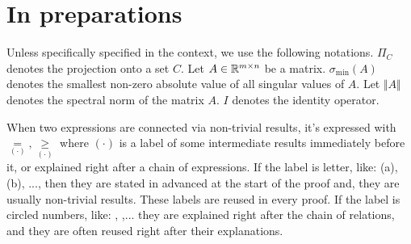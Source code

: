 \documentclass[12pt]{article}
\begin{document}
\section{In preparations}
    Unless specifically specified in the context, we use the following notations. 
    $\Pi_C$ denotes the projection onto a set $C$. 
    Let $A \in \mathbb R^{m \times n}$ be a matrix. 
    $\sigma_{\min}(A)$ denotes the smallest non-zero absolute value of all singular values of $A$. 
    Let $\Vert A\Vert$ denotes the spectral norm of the matrix $A$. 
    $I$ denotes the identity operator. 
    \par
    When two expressions are connected via non-trivial results, it's expressed with $\underset{(\cdot)}{=}, \underset{(\cdot)}{\ge}$ where $(\cdot)$ is a label of some intermediate results immediately before it, or explained right after a chain of expressions. 
    If the label is letter, like: (a), (b), ..., then they are stated in advanced at the start of the proof and, they are usually non-trivial results. 
    These labels are reused in every proof. 
    If the label is circled numbers, like: , ,... they are explained right after the chain of relations, and they are often reused right after their explanations. 
\end{document}
